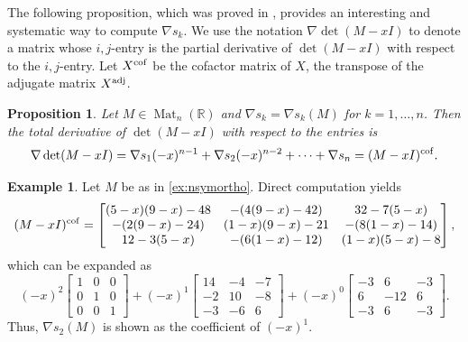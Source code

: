 \documentclass{article}
\newtheorem{proposition}[theorem]{Proposition}
\theoremstyle{definition}
\newtheorem{example}[theorem]{Example}
\newcommand{\adj}{^{\rm adj}}
\newcommand{\cof}{^{\rm cof}}
\newcommand{\mat}[1][n]{\operatorname{Mat}_{#1}(\mathbb{R})}
\begin{document}
The following proposition, which was proved in \cite{GB12}, provides an interesting and systematic way to compute $\nabla s_k$.  We use the notation $\nabla\det(M - xI)$ to denote a matrix whose $i,j$-entry is the partial derivative of $\det(M - xI)$ with respect to the $i,j$-entry. Let $X\cof$ be the cofactor matrix of $X$, the transpose of the adjugate matrix $X\adj$. 

\begin{proposition}
\label{prop:gradientadj}
Let $M\in\mat$ and $\nabla s_k = \nabla s_k(M)$ for $k = 1, \ldots, n$.  Then the total derivative of $\det(M - xI)$ with respect to the entries is 
\[
    \nabla\det(M - xI) = \nabla s_1(-x)^{n-1} + \nabla s_2(-x)^{n-2} + \cdots + \nabla s_n = (M - xI)\cof.
\] 
\end{proposition}

\begin{example}
Let $M$ be as in \cref{ex:nsymortho}.  Direct computation yields
\[
(M - xI)\cof =    \begin{bmatrix}
        (5-x)(9-x)-48 & -(4(9-x)-42) & 32-7(5-x) \\
        -(2(9-x)-24) & (1-x)(9-x)-21 & -(8(1-x)-14) \\
        12-3(5-x) & -(6(1-x)-12) & (1-x)(5-x)-8
    \end{bmatrix},
\]
which can be expanded as 
\[
    (-x)^2\begin{bmatrix}
        1 & 0 & 0 \\
        0 & 1 & 0 \\
        0 & 0 & 1
    \end{bmatrix} + 
    (-x)^1\begin{bmatrix}
        14 & -4 & -7 \\
        -2 & 10 & -8 \\
        -3 & -6 & 6
    \end{bmatrix} + 
    (-x)^0\begin{bmatrix}
        -3 & 6 & -3 \\
        6 & -12 & 6 \\
        -3 & 6 & -3
    \end{bmatrix}.
\]
Thus,  $\nabla s_2(M)$ is  shown as the coefficient of $(-x)^1$.  
\end{example}
\end{document}
